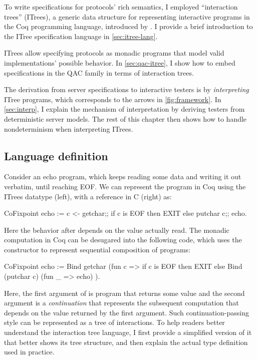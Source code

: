 To write specifications for protocols' rich semantics, I employed ``interaction
trees'' (ITrees), a generic data structure for representing interactive programs
in the Coq programming language, introduced by \citet{itree}.  I provide a brief
introduction to the ITree specification language in \autoref{sec:itree-lang}.

ITrees allow specifying protocols as monadic programs that model valid
implementations' possible behavior.  In \autoref{sec:qac-itree}, I show how to
embed specifications in the QAC family in terms of interaction trees.

The derivation from server specifications to interactive testers is by {\em
interpreting} ITree programs, which corresponds to the arrows
in \autoref{fig:framework}.  In \autoref{sec:interp}, I explain the mechanism of
interpretation by deriving testers from deterministic server models.  The rest
of this chapter then shows how to handle nondeterminism when interpreting
ITrees.

\subsection{Language definition}
\label{sec:itree-lang}
Consider an echo program, which keeps reading some data and writing it out
verbatim, until reaching EOF.  We can represent the program in Coq using the
ITrees datatype (left), with a reference in C (right) as:
\begin{multicols}{2}
\begin{coq}
  CoFixpoint echo :=
    c <- getchar;;
    if c is EOF
    then EXIT
    else
      putchar c;;
      echo.
\end{coq}
\columnbreak
\begin{cpp}
  void echo() {
    const char c = getchar();
    if (c == EOF)
      return;
    else {
      putchar(c);
      echo();
    }
\end{cpp}
\end{multicols}
Here the behavior after  depends on the value actually read.  The
monadic computation in Coq can be desugared into the following code, which uses
the  constructor to represent sequential composition of programs:
\begin{coq}
  CoFixpoint echo :=
    Bind getchar
         (fun c => if c is EOF
                 then EXIT
                 else Bind (putchar c)
                           (fun _ => echo)
         ).
\end{coq}
Here, the first argument of  is program that returns some value and
the second argument is a {\em continuation} that represents the subsequent
computation that depends on the value returned by the first argument.  Such
continuation-passing style can be represented as a tree of interactions.  To
help readers better understand the interaction tree language, I first provide a
simplified version of it that better shows its tree structure, and then explain
the actual type definition used in practice.

